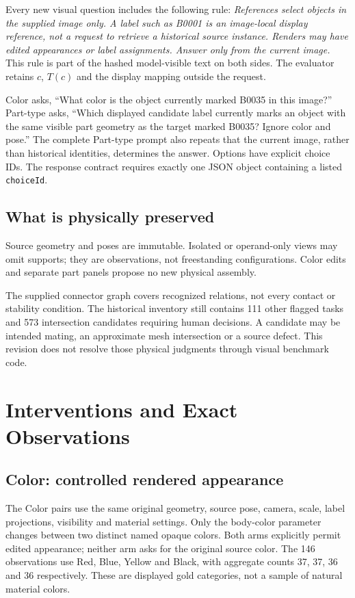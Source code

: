 \documentclass[10pt,twocolumn,letterpaper]{article}
\begin{document}
Every new visual question includes the following rule:
\emph{References select objects in the supplied image only. A label
such as B0001 is an image-local display reference, not a request to
retrieve a historical source instance. Renders may have edited
appearances or label assignments. Answer only from the current image.}
This rule is part of the hashed model-visible text on both sides.
The evaluator retains $c$, $T(c)$ and the display mapping outside
the request.

Color asks, ``What color is the object currently marked B0035 in
this image?'' Part-type asks, ``Which displayed candidate label
currently marks an object with the same visible part geometry as
the target marked B0035? Ignore color and pose.'' The complete
Part-type prompt also repeats that the current image, rather than
historical identities, determines the answer. Options have explicit
choice IDs. The response contract requires exactly one JSON object
containing a listed \texttt{choiceId}.

\subsection{What is physically preserved}
Source geometry and poses are immutable. Isolated or operand-only
views may omit supports; they are observations, not freestanding
configurations. Color edits and separate part panels propose no new
physical assembly.

The supplied connector graph covers recognized relations, not every
contact or stability condition. The historical inventory still contains
111 other flagged tasks and 573 intersection candidates requiring
human decisions. A candidate may be intended mating, an approximate
mesh intersection or a source defect. This revision does not resolve
those physical judgments through visual benchmark code.

\section{Interventions and Exact Observations}
\subsection{Color: controlled rendered appearance}
The \EvColor{} Color pairs use the same original geometry, source
pose, camera, scale, label projections, visibility and material
settings. Only the body-color parameter changes between two distinct
named opaque colors. Both arms explicitly permit edited appearance;
neither arm asks for the original source color. The 146 observations
use Red, Blue, Yellow and Black, with aggregate counts 37, 37, 36 and
36 respectively. These are displayed gold categories, not a sample
of natural material colors.
\end{document}
